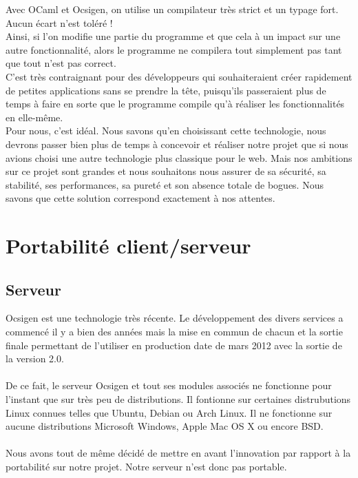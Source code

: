 \documentclass{life-fr}
\begin{document}
\newpage

Avec OCaml et Ocsigen, on utilise un compilateur très strict et un typage fort. Aucun écart n'est toléré !\\
Ainsi, si l'on modifie une partie du programme et que cela à un impact sur une autre fonctionnalité, alors le programme ne compilera tout simplement pas tant que tout n'est pas correct.\\

C'est très contraignant pour des développeurs qui souhaiteraient créer rapidement de petites applications sans se prendre la tête, puisqu'ils passeraient plus de temps à faire en sorte que le programme compile qu'à réaliser les fonctionnalités en elle-même.\\
Pour nous, c'est idéal. Nous savons qu'en choisissant cette technologie, nous devrons passer bien plus de temps à concevoir et réaliser notre projet que si nous avions choisi une autre technologie plus classique pour le web. Mais nos ambitions sur ce projet sont grandes et nous souhaitons nous assurer de sa sécurité, sa stabilité, ses performances, sa pureté et son absence totale de bogues. Nous savons que cette solution correspond exactement à nos attentes.
\\

\section{Portabilité client/serveur}

\subsection{Serveur}

Ocsigen est une technologie très récente. Le développement des divers services a
commencé il y a bien des années mais la mise en commun de chacun et la sortie
finale permettant de l'utiliser en production date de mars 2012 avec la sortie
de la version 2.0.\\
\\
De ce fait, le serveur Ocsigen et tout ses modules associés ne fonctionne
pour l'instant que sur très peu de distributions. Il fontionne sur certaines
distrubutions Linux connues telles que Ubuntu, Debian ou Arch Linux. Il ne
fonctionne sur aucune distributions Microsoft Windows, Apple Mac OS X ou encore
BSD.\\
\\
Nous avons tout de même décidé de mettre en avant l'innovation par rapport
à la portabilité sur notre projet. Notre serveur n'est donc pas portable.
\end{document}
